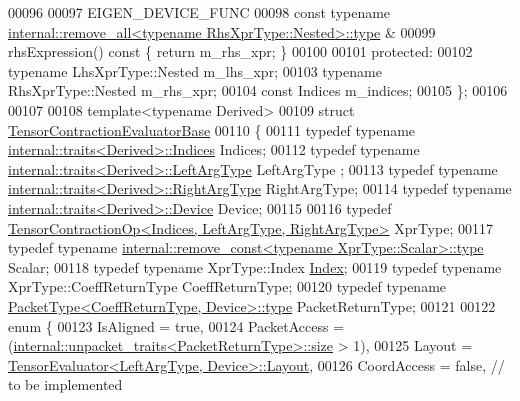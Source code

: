 \begin{DoxyCode}
00096 
00097   EIGEN\_DEVICE\_FUNC
00098   \textcolor{keyword}{const} \textcolor{keyword}{typename} \hyperlink{group___sparse_core___module}{internal::remove\_all<typename RhsXprType::Nested>::type}
      &
00099   rhsExpression()\textcolor{keyword}{ const }\{ \textcolor{keywordflow}{return} m\_rhs\_xpr; \}
00100 
00101   \textcolor{keyword}{protected}:
00102     \textcolor{keyword}{typename} LhsXprType::Nested m\_lhs\_xpr;
00103     \textcolor{keyword}{typename} RhsXprType::Nested m\_rhs\_xpr;
00104     \textcolor{keyword}{const} Indices m\_indices;
00105 \};
00106 
00107 
00108 \textcolor{keyword}{template}<\textcolor{keyword}{typename} Derived>
00109 \textcolor{keyword}{struct }\hyperlink{struct_eigen_1_1_tensor_contraction_evaluator_base}{TensorContractionEvaluatorBase}
00110 \{
00111   \textcolor{keyword}{typedef} \textcolor{keyword}{typename} \hyperlink{struct_eigen_1_1internal_1_1traits}{internal::traits<Derived>::Indices} Indices;
00112   \textcolor{keyword}{typedef} \textcolor{keyword}{typename} \hyperlink{struct_eigen_1_1internal_1_1traits}{internal::traits<Derived>::LeftArgType} LeftArgType
      ;
00113   \textcolor{keyword}{typedef} \textcolor{keyword}{typename} \hyperlink{struct_eigen_1_1internal_1_1traits}{internal::traits<Derived>::RightArgType} 
      RightArgType;
00114   \textcolor{keyword}{typedef} \textcolor{keyword}{typename} \hyperlink{struct_eigen_1_1internal_1_1traits}{internal::traits<Derived>::Device} Device;
00115 
00116   \textcolor{keyword}{typedef} \hyperlink{class_eigen_1_1_tensor_contraction_op}{TensorContractionOp<Indices, LeftArgType, RightArgType>}
       XprType;
00117   \textcolor{keyword}{typedef} \textcolor{keyword}{typename} \hyperlink{group___sparse_core___module}{internal::remove\_const<typename XprType::Scalar>::type}
       Scalar;
00118   \textcolor{keyword}{typedef} \textcolor{keyword}{typename} XprType::Index \hyperlink{namespace_eigen_a62e77e0933482dafde8fe197d9a2cfde}{Index};
00119   \textcolor{keyword}{typedef} \textcolor{keyword}{typename} XprType::CoeffReturnType CoeffReturnType;
00120   \textcolor{keyword}{typedef} \textcolor{keyword}{typename} \hyperlink{group___sparse_core___module}{PacketType<CoeffReturnType, Device>::type} 
      PacketReturnType;
00121 
00122   \textcolor{keyword}{enum} \{
00123     IsAligned = \textcolor{keyword}{true},
00124     PacketAccess = (\hyperlink{struct_eigen_1_1internal_1_1unpacket__traits}{internal::unpacket\_traits<PacketReturnType>::size}
       > 1),
00125     Layout = \hyperlink{struct_eigen_1_1_tensor_evaluator}{TensorEvaluator<LeftArgType, Device>::Layout},
00126     CoordAccess = \textcolor{keyword}{false},  \textcolor{comment}{// to be implemented}

\end{DoxyCode}
